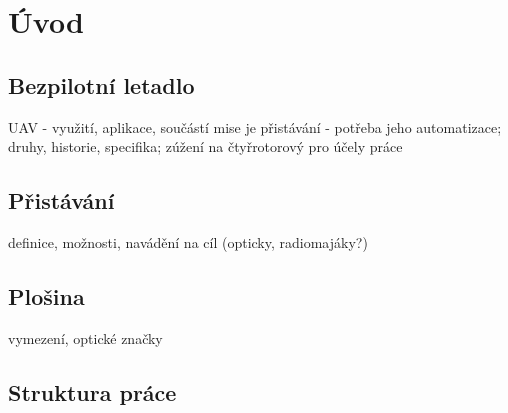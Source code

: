 \chapter{Úvod} \label{chap:introduction}




\section{Bezpilotní letadlo}
UAV - využití, aplikace, součástí mise je přistávání - potřeba jeho automatizace; druhy, historie, specifika; zúžení na čtyřrotorový pro účely práce
\section{Přistávání}
definice, možnosti, navádění na cíl (opticky, radiomajáky?)
\section{Plošina}
vymezení, optické značky
\section{Struktura práce}